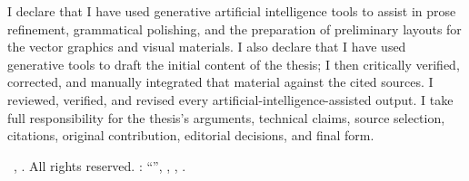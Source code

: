 \clearpage
{}
\thispagestyle{empty}
\hfill
\vfill

\par\medskip
{\noindent I declare that I have used generative artificial intelligence tools to assist in
prose refinement, grammatical polishing, and the preparation of preliminary layouts for
the vector graphics and visual materials. I also declare that I have used generative tools
to draft the initial content of the thesis; I then critically verified, corrected, and manually
integrated that material against the cited sources. I reviewed, verified, and revised every
artificial-intelligence-assisted output. I take full responsibility for the thesis’s arguments,
technical claims, source selection, citations, original contribution, editorial decisions, and
final form.}

\par\medskip

{\small\noindent\textcopyright\ \myName, \myTime. All rights reserved. \myDegree: ``\textit{\myTitle}'', \myUni, \myDepartment, \myFaculty.}
